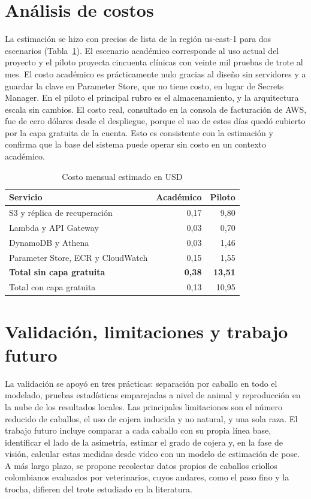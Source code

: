 \documentclass[conference,a4paper]{IEEEtran}
\begin{document}
\section{Análisis de costos}
La estimación se hizo con precios de lista de la región us-east-1 para dos escenarios (Tabla~\ref{tab:costos}). El escenario académico corresponde al uso actual del proyecto y el piloto proyecta cincuenta clínicas con veinte mil pruebas de trote al mes. El costo académico es prácticamente nulo gracias al diseño sin servidores y a guardar la clave en Parameter Store, que no tiene costo, en lugar de Secrets Manager. En el piloto el principal rubro es el almacenamiento, y la arquitectura escala sin cambios. El costo real, consultado en la consola de facturación de AWS, fue de cero dólares desde el despliegue, porque el uso de estos días quedó cubierto por la capa gratuita de la cuenta. Esto es consistente con la estimación y confirma que la base del sistema puede operar sin costo en un contexto académico.

\begin{table}[t]
\centering
\caption{Costo mensual estimado en USD}
\label{tab:costos}
\begin{tabular}{lrr}
\toprule
Servicio & Académico & Piloto \\
\midrule
S3 y réplica de recuperación & 0,17 & 9,80 \\
Lambda y API Gateway & 0,03 & 0,70 \\
DynamoDB y Athena & 0,03 & 1,46 \\
Parameter Store, ECR y CloudWatch & 0,15 & 1,55 \\
\midrule
\textbf{Total sin capa gratuita} & \textbf{0,38} & \textbf{13,51} \\
Total con capa gratuita & 0,13 & 10,95 \\
\bottomrule
\end{tabular}
\end{table}

\section{Validación, limitaciones y trabajo futuro}
La validación se apoyó en tres prácticas: separación por caballo en todo el modelado, pruebas estadísticas emparejadas a nivel de animal y reproducción en la nube de los resultados locales. Las principales limitaciones son el número reducido de caballos, el uso de cojera inducida y no natural, y una sola raza. El trabajo futuro incluye comparar a cada caballo con su propia línea base, identificar el lado de la asimetría, estimar el grado de cojera y, en la fase de visión, calcular estas medidas desde video con un modelo de estimación de pose. A más largo plazo, se propone recolectar datos propios de caballos criollos colombianos evaluados por veterinarios, cuyos andares, como el paso fino y la trocha, difieren del trote estudiado en la literatura.
\end{document}
